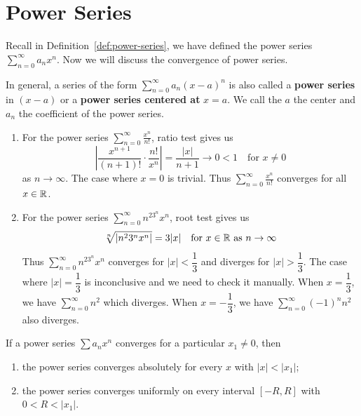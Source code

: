     \section{Power Series}
    Recall in Definition~\ref{def:power-series}, we have defined the power series $\displaystyle \sum_{n=0}^\infty a_n x^n$. Now we will discuss the convergence of power series.
    \begin{definitionenv}
        In general, a series of the form $\displaystyle \sum_{n=0}^\infty a_n (x-a)^n$ is also called a \textbf{power series} in $(x-a)$ or a \textbf{power series centered at} $x=a$. We call the $a$ the center and $a_n$ the coefficient of the power series.
    \end{definitionenv}
    \begin{exampleenv}
        \begin{enumerate}
            \item For the power series $\displaystyle \sum_{n=0}^\infty \frac{x^n}{n!}$, ratio test gives us
            $$ \left| \frac{x^{n+1}}{(n+1)!} \cdot \frac{n!}{x^n} \right| = \frac{|x|}{n+1} \to 0 < 1\quad \text{for } x\neq 0$$
            as $n\to \infty$. The case where $x=0$ is trivial. Thus $\displaystyle \sum_{n=0}^\infty \frac{x^n}{n!}$ converges for all $x\in \mathbb{R}$.
            \item For the power series $\displaystyle \sum_{n=0}^\infty n^23^n x^n$, root test gives us
            $$ \sqrt[n]{|n^23^n x^n|} = 3|x| \quad \text{for } x\in \mathbb{R} \text{ as } n\to \infty$$
            Thus $\displaystyle \sum_{n=0}^\infty n^23^n x^n$ converges for $|x| < \dfrac{1}{3}$ and diverges for $|x| > \dfrac{1}{3}$. The case where $|x| = \dfrac{1}{3}$ is inconclusive and we need to check it manually. When $x=\dfrac{1}{3}$, we have $\displaystyle \sum_{n=0}^\infty n^2$ which diverges. When $x=-\dfrac{1}{3}$, we have $\displaystyle \sum_{n=0}^\infty (-1)^n n^2$ also diverges.
        \end{enumerate}
    \end{exampleenv}
    \begin{theoremenv}\label{convergence_power_series}
        If a power series $\sum a_n x^n$ converges for a particular $x_1 \neq 0$, then
        \begin{enumerate}[label=(\alph*)]
            \item the power series converges absolutely for every $x$ with $|x| < |x_1|$;
            \item the power series converges uniformly on every interval $[-R,R]$ with $0<R<|x_1|$.
        \end{enumerate}
    \end{theoremenv}
